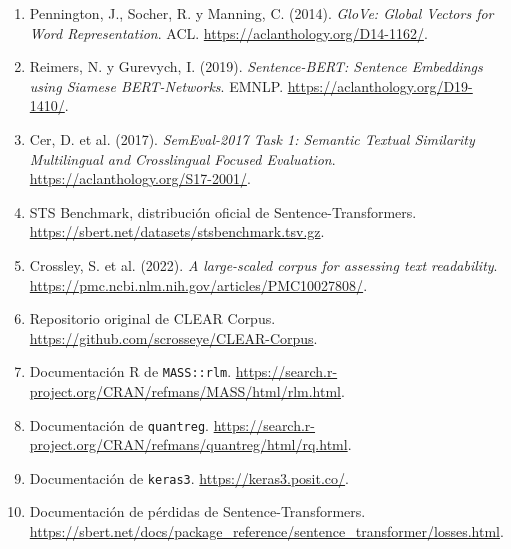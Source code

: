 \documentclass[11pt,a4paper]{article}
\begin{document}
\begin{enumerate}
\item Pennington, J., Socher, R. y Manning, C. (2014). \emph{GloVe: Global Vectors for Word Representation}. ACL. \url{https://aclanthology.org/D14-1162/}.
\item Reimers, N. y Gurevych, I. (2019). \emph{Sentence-BERT: Sentence Embeddings using Siamese BERT-Networks}. EMNLP. \url{https://aclanthology.org/D19-1410/}.
\item Cer, D. et al. (2017). \emph{SemEval-2017 Task 1: Semantic Textual Similarity Multilingual and Crosslingual Focused Evaluation}. \url{https://aclanthology.org/S17-2001/}.
\item STS Benchmark, distribución oficial de Sentence-Transformers. \url{https://sbert.net/datasets/stsbenchmark.tsv.gz}.
\item Crossley, S. et al. (2022). \emph{A large-scaled corpus for assessing text readability}. \url{https://pmc.ncbi.nlm.nih.gov/articles/PMC10027808/}.
\item Repositorio original de CLEAR Corpus. \url{https://github.com/scrosseye/CLEAR-Corpus}.
\item Documentación R de \texttt{MASS::rlm}. \url{https://search.r-project.org/CRAN/refmans/MASS/html/rlm.html}.
\item Documentación de \texttt{quantreg}. \url{https://search.r-project.org/CRAN/refmans/quantreg/html/rq.html}.
\item Documentación de \texttt{keras3}. \url{https://keras3.posit.co/}.
\item Documentación de pérdidas de Sentence-Transformers. \url{https://sbert.net/docs/package_reference/sentence_transformer/losses.html}.
\end{enumerate}
\end{document}
